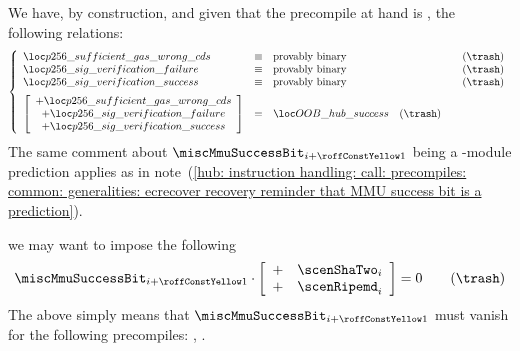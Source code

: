 \begin{description}
\begin{description}
\begin{description}
						\saNote{}
						We have, by construction, and given that the precompile at hand is \instPVerify{}, the following relations:
						\[
							\left\{ \begin{array}{lclr}
								\locOobPVerifySufficientGasWrongCds & \equiv & \text{provably binary} & \quad (\trash) \\
								\locSignatureVerificationFailure    & \equiv & \text{provably binary} & \quad (\trash) \\
								\locSignatureVerificationSuccess    & \equiv & \text{provably binary} & \quad (\trash) \vspace{2mm} \\
								\left[ \begin{array}{cl}
									+ \locOobPVerifySufficientGasWrongCds \\
								        + \locSignatureVerificationFailure    \\
									+ \locSignatureVerificationSuccess    \\
								\end{array} \right] & = &  \locOobResultHubSuccess \quad (\trash) \\
							\end{array} \right.
						\]
						\saNote{}
						The same comment about $\miscMmuSuccessBit_{i + \prcCommonMiscRowOffset}$
						being a \hubMod{}-module prediction applies as in
						note~(\ref{hub: instruction handling: call: precompiles: common: generalities: ecrecover recovery reminder that MMU success bit is a prediction}).
				\end{description}
			\item[\underline{Some constraints involving the success bit:}]
				we may want to impose the following
				\[
					\miscMmuSuccessBit_{i + \prcCommonMiscRowOffset} \cdot 
					\left[ \begin{array}{cl}
						+ & \scenShaTwo        _{i}  \\
						+ & \scenRipemd        _{i}  \\
					\end{array} \right]
					= 0 \qquad (\trash)
				\]
				The above simply means that $\miscMmuSuccessBit_{i + \prcCommonMiscRowOffset}$ must vanish for the following precompiles:
				\instShaTwo{},
				\instRipemd{}.


\end{description}
\end{description}
